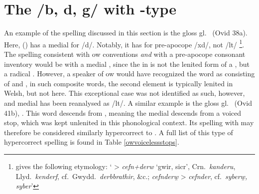 
\section{The /b, d, g/ with -type}
\label{bdgwithptc}
An example of the spelling discussed in this section is the gloss  gl.\  (Ovid 38a). Here,   () has a medial  for /d/. Notably, it has  for pre-apocope /\gls{x}d/, not /\gls{l}t/%
\footnote{\textcite[s.v.\ ]{bevan_geiriadur_2014} gives the following etymology: `\textwelsh{ > \textit{cefn+derw} ‘gwir, sicr’, Crn.\ \textit{kanderu}, Llyd.\ \textit{kenderf}, cf.\ Gwydd.\ \textit{derbbrathir}, \&c.; \textit{cefnderw̯} > \textit{cefnder}, cf.\ \textit{syberw̯, syber}}'}. 
The spelling consistent with \gls{ow} conventions \emph{and} with a pre-apocope consonant inventory would be with a medial , since the  in  is not the lenited form of a , but a radical . However, a speaker of \gls{ow} would have recognized the word as consisting of  and , in such composite words, the second element is typically lenited in Welsh, but not here. This exceptional case was not identified as such, however, and medial  has been reanalysed as /\gls{l}t/. A similar example is the gloss  gl.\  (Ovid 41b), . This word descends from , meaning the medial  descends from a voiced stop, which was kept unlenited in this phonological context. Its spelling with  may therefore be considered similarly hypercorrect to . A full list of this type of hypercorrect spelling is found in Table \ref{owvoicelessstops}. 

